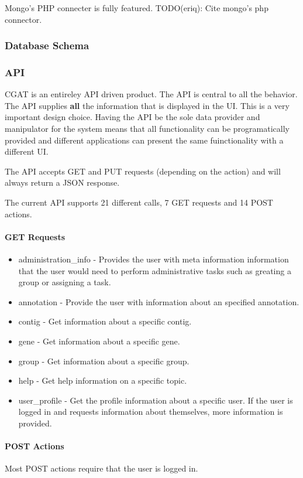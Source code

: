 \documentclass[10pt, conference, compsocconf]{IEEEtran}
\begin{document}
Mongo's PHP connecter is fully featured.
TODO(eriq): Cite mongo's php connector.

\subsubsection{Database Schema}

\subsubsection{API}
CGAT is an entireley API driven product. The API is central to all the behavior.
The API supplies \textbf{all} the information that is displayed in the UI.
This is a very important design choice. Having the API be the sole data provider and manipulator for the system
means that all functionality can be programatically provided and different applications can present the same
fuinctionality with a different UI.

The API accepts GET and PUT requests (depending on the action) and will always return a JSON response.

The current API supports 21 different calls, 7 GET requests and 14 POST actions.

\paragraph{GET Requests}
\begin{itemize}
\item administration_info - Provides the user with meta information information that the user would need to perform administrative tasks such as greating a group or assigning a task.
\item annotation - Provide the user with information about an specified annotation.
\item contig - Get information about a specific contig.
\item gene - Get information about a specific gene.
\item group - Get information about a specific group.
\item help - Get help information on a specific topic.
\item user_profile - Get the profile information about a specific user. If the user is logged in and requests information about themselves, more information is provided.
\end{itemize}

\paragraph{POST Actions}
Most POST actions require that the user is logged in.
\end{document}
